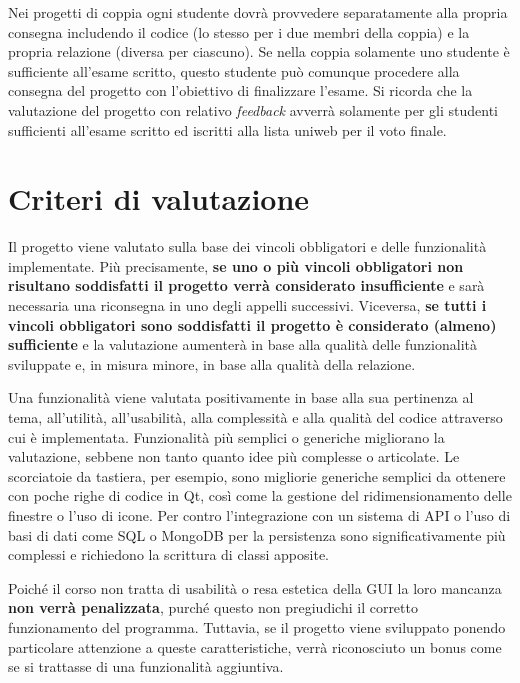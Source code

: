 \documentclass[10pt,a4paper,oneside]{article}
\begin{document}
Nei progetti di coppia ogni studente dovrà provvedere separatamente alla propria consegna includendo il codice (lo stesso per i due membri della coppia) e la propria relazione (diversa per ciascuno). Se nella coppia solamente uno studente è sufficiente all'esame scritto, questo studente può comunque procedere alla consegna del progetto con l'obiettivo di finalizzare l'esame. Si ricorda che la valutazione del progetto con relativo \emph{feedback} avverrà solamente per gli studenti sufficienti all'esame scritto ed iscritti alla lista uniweb per il voto finale.


\section{Criteri di valutazione}
Il progetto viene valutato sulla base dei vincoli obbligatori e delle funzionalità implementate. Più precisamente, \textbf{se uno o più vincoli obbligatori non risultano soddisfatti il progetto verrà considerato insufficiente} e sarà necessaria una riconsegna in uno degli appelli successivi. Viceversa, \textbf{se tutti i vincoli obbligatori sono soddisfatti il progetto è considerato (almeno) sufficiente} e la valutazione aumenterà in base alla qualità delle funzionalità sviluppate e, in misura minore, in base alla qualità della relazione.

Una funzionalità viene valutata positivamente in base alla sua pertinenza al tema, all'utilità, all'usabilità, alla complessità e alla qualità del codice attraverso cui è implementata. Funzionalità più semplici o generiche migliorano la valutazione, sebbene non tanto quanto idee più complesse o articolate. Le scorciatoie da tastiera, per esempio, sono migliorie generiche semplici da ottenere con poche righe di codice in Qt, così come la gestione del ridimensionamento delle finestre o l'uso di icone. Per contro l'integrazione con un sistema di API o l'uso di basi di dati come SQL o MongoDB per la persistenza sono significativamente più complessi e richiedono la scrittura di classi apposite.

Poiché il corso non tratta di usabilità o resa estetica della GUI la loro mancanza \textbf{non verrà penalizzata}, purché questo non pregiudichi il corretto funzionamento del programma. Tuttavia, se il progetto viene sviluppato ponendo particolare attenzione a queste caratteristiche, verrà riconosciuto un bonus come se si trattasse di una funzionalità aggiuntiva.
\end{document}
